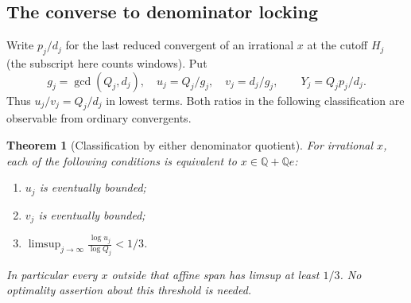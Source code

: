 \documentclass[11pt]{amsart}
\newtheorem{theorem}{Theorem}[section]
\theoremstyle{definition}
\theoremstyle{remark}
\numberwithin{equation}{section}
\begin{document}
\subsection{The converse to denominator locking}
Write $p_j/d_j$ for the last reduced convergent of an irrational $x$
at the cutoff $H_j$ (the subscript here counts windows). Put
\[
 g_j=\gcd(Q_j,d_j),\quad u_j=Q_j/g_j,\quad v_j=d_j/g_j,
 \qquad Y_j=Q_jp_j/d_j .
\]
Thus $u_j/v_j=Q_j/d_j$ in lowest terms. Both ratios in the following
classification are observable from ordinary convergents.
\begin{theorem}[Classification by either denominator quotient]\label{thm:gcd-converse}
For irrational $x$, each of the following conditions is equivalent to
$x\in\mathbb Q+\mathbb Q e$:
\begin{enumerate}
\item $u_j$ is eventually bounded;
\item $v_j$ is eventually bounded;
\item $\displaystyle\limsup_{j\to\infty}\frac{\log u_j}{\log Q_j}<1/3$.
\end{enumerate}
In particular every $x$ outside that affine span has limsup at least
$1/3$. No optimality assertion about this threshold is needed.
\end{theorem}
\end{document}
